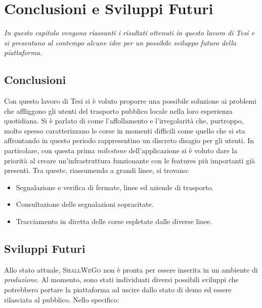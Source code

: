 \chapter{Conclusioni e Sviluppi Futuri} %
%


\begin{citazione}
	\textit{In questo capitolo vengono riassunti i risultati ottenuti in questo lavoro di Tesi e si presentano al contempo alcune idee per un possibile sviluppo futuro della piattaforma.}
\end{citazione}

\newpage

\section{Conclusioni}
	Con questo lavoro di Tesi si è voluto proporre una possibile soluzione ai problemi che affliggono gli utenti del trasporto pubblico locale nella loro esperienza quotidiana. Si è parlato di come l'affollamento e l'irregolarità che, purtroppo, molto spesso caratterizzano le corse in momenti difficili come quello che si sta affrontando in questo periodo rappresentino un discreto disagio per gli utenti. In particolare, con questa prima \textit{milestone} dell'applicazione si è voluto dare la priorità al creare un'infrastruttura funzionante con le features più importanti già presenti. Tra queste, riassumendo a grandi linee, si trovano: 
	\begin{itemize}
		\item Segnalazione e verifica di fermate, linee ed aziende di trasporto.
		\item Consultazione delle segnalazioni sopracitate.
		\item Tracciamento in diretta delle corse espletate dalle diverse linee.
	\end{itemize}

	\section{Sviluppi Futuri}
		Allo stato attuale, \textsc{ShallWeGo} non è pronta per essere inserita in un ambiente di \textit{produzione}. Al momento, sono stati individuati diversi possibili sviluppi che potrebbero portare la piattaforma ad uscire dallo stato di demo ed essere rilasciata al pubblico. Nello specifico: 

